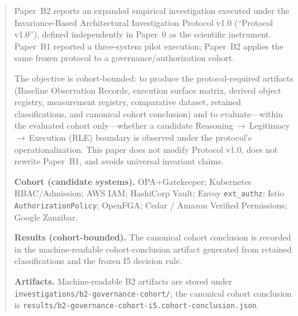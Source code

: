 \begin{abstract}
Paper~B2 reports an expanded empirical investigation executed under the Invariance-Based Architectural Investigation Protocol v1.0 (``Protocol v1.0''), defined independently in Paper~0 as the scientific instrument. Paper~B1 reported a three-system pilot execution; Paper~B2 applies the same frozen protocol to a governance/authorization cohort.

The objective is cohort-bounded: to produce the protocol-required artifacts (Baseline Observation Records, execution surface matrix, derived object registry, measurement registry, comparative dataset, retained classifications, and canonical cohort conclusion) and to evaluate---within the evaluated cohort only---whether a candidate Reasoning\,$\rightarrow$\,Legitimacy\,$\rightarrow$\,Execution (RLE) boundary is observed under the protocol's operationalization. This paper does not modify Protocol v1.0, does not rewrite Paper~B1, and avoids universal invariant claims.

\textbf{Cohort (candidate systems).} OPA+Gatekeeper; Kubernetes RBAC/Admission; AWS IAM; HashiCorp Vault; Envoy \texttt{ext\_authz}; Istio \texttt{AuthorizationPolicy}; OpenFGA; Cedar / Amazon Verified Permissions; Google Zanzibar.

\textbf{Results (cohort-bounded).} The canonical cohort conclusion is recorded in the machine-readable cohort-conclusion artifact generated from retained classifications and the frozen I5 decision rule.

\textbf{Artifacts.} Machine-readable B2 artifacts are stored under \texttt{investigations/b2-governance-cohort/}; the canonical cohort conclusion is \texttt{results/b2-governance-cohort-i5.cohort-conclusion.json}.
\end{abstract}

